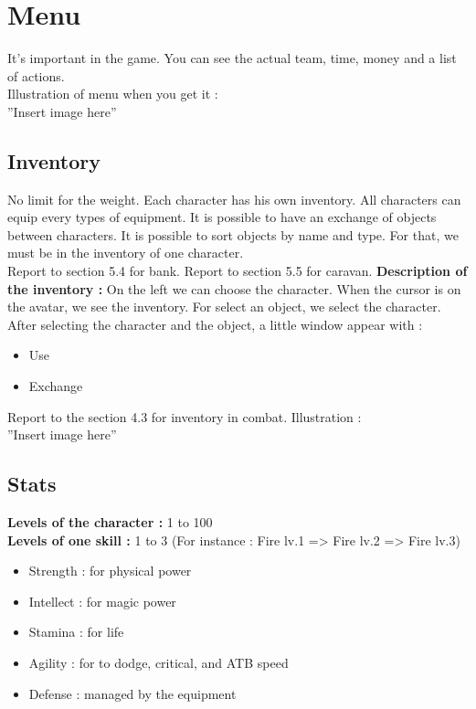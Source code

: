 \documentclass[a4paper,12pt]{book}
\begin{document}
\section{Menu}
It's important in the game. You can see the actual team, time, money and a list of actions. \\ Illustration of menu when you get it : \\ ''Insert image here''
\subsection{Inventory}
No limit for the weight. Each character has his own inventory. All characters can equip every types of equipment. It is possible to have an exchange of objects between characters. It is possible to sort objects by name and type. For that, we must be in the inventory of one character. \\
Report to section 5.4 for bank.
Report to section 5.5 for caravan.
\textbf{Description of the inventory :} On the left we can choose the character. When the cursor is on the avatar, we see the inventory. For select an object, we select the character. After selecting the character and the object, a little window appear with :
\begin{itemize}
\item Use
\item Exchange
\end{itemize}
Report to the section 4.3 for inventory in combat.
Illustration : \\ ''Insert image here''
\subsection{Stats}
\textbf{Levels of the character :} 1 to 100 \\
\textbf{Levels of one skill :} 1 to 3 \newpage (For instance : Fire lv.1 => Fire lv.2 => Fire lv.3)
\begin{itemize}
\item Strength : for physical power
\item Intellect : for magic power
\item Stamina : for life
\item Agility : for to dodge, critical, and ATB speed
\item Defense : managed by the equipment
\end{itemize}
\end{document}
